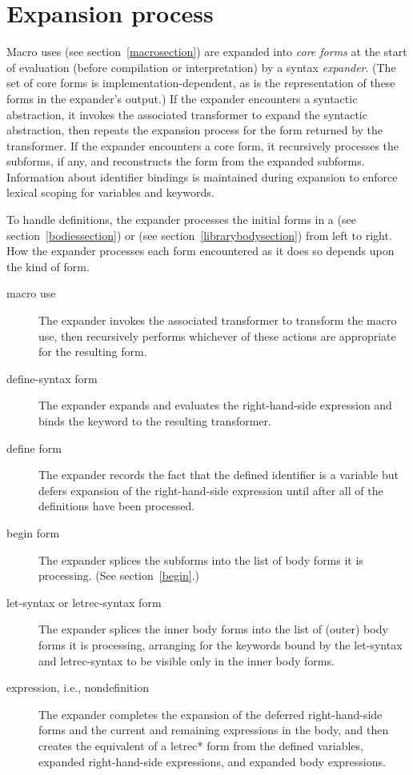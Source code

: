 \chapter{Expansion process}
\label{expansionchapter}

Macro uses (see section~\ref{macrosection}) are expanded into \textit{core
forms} at the start of evaluation (before compilation or interpretation)
by a syntax \emph{expander}.
(The set of core forms is implementation-dependent, as is the
representation of these forms in the expander's output.)
If the expander encounters a syntactic abstraction, it invokes
the associated transformer to expand the syntactic abstraction, then
repeats the expansion process for the form returned by the transformer.
If the expander encounters a core form, it recursively
processes the subforms, if any, and reconstructs the form from the
expanded subforms.
Information about identifier bindings is maintained during expansion
to enforce lexical scoping for variables and keywords.

To handle definitions, the expander processes the initial
forms in a  (see section~\ref{bodiessection}) or
 (see section~\ref{librarybodysection})
from left to
right.  How the expander processes each form encountered as it does so
depends upon the kind of form.

\begin{description}
\item[macro use]
The expander invokes the associated transformer to transform the macro
use, then recursively performs whichever of these actions are appropriate
for the resulting form.

\item[{\cf define-syntax} form]
The expander expands and evaluates the right-hand-side expression and binds the
keyword to the resulting transformer.

\item[{\cf define} form]
The expander records the fact that the defined identifier is a variable but defers
expansion of the right-hand-side expression until after all of the
definitions have been processed.

\item[{\cf begin} form]
The expander splices the subforms into the list of body forms it is
processing.  (See section~\ref{begin}.)

\item[{\cf let-syntax} or {\cf letrec-syntax} form]
The expander splices the inner body forms into the list of (outer) body forms it is
processing, arranging for the keywords bound by the {\cf let-syntax}
and {\cf letrec-syntax} to be visible only in the inner body forms.

\item[expression, i.e., nondefinition]
The expander completes the expansion of the deferred right-hand-side forms
and the current and remaining expressions in the body, and then
creates the equivalent of a {\cf letrec*} form from the defined variables,
expanded right-hand-side expressions, and expanded body expressions.
\end{description}

